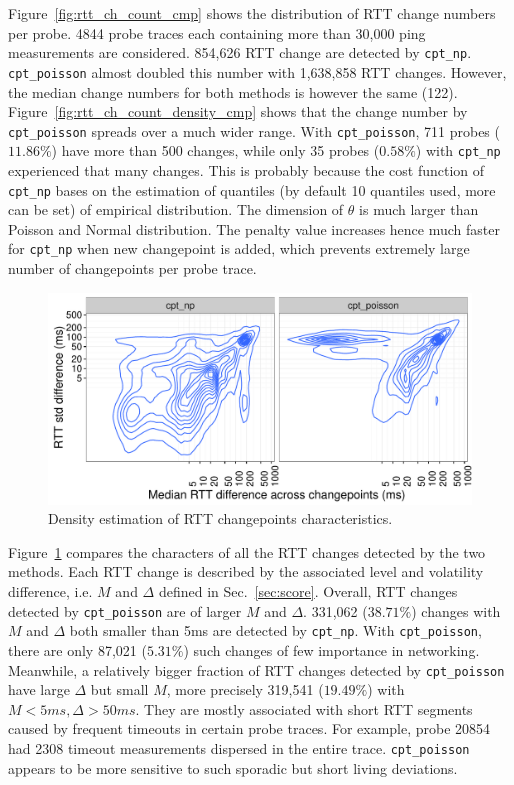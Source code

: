 Figure~\ref{fig:rtt_ch_count_cmp} shows the distribution of RTT change numbers per probe. 4844 probe traces each containing more than 30,000 ping measurements are considered. 
854,626 RTT change are detected by \texttt{cpt\_np}.
\texttt{cpt\_poisson} almost doubled this number with 1,638,858 RTT changes.
However, the median change numbers for both methods is however the same (122).
Figure~\ref{fig:rtt_ch_count_density_cmp} shows that the change number by \texttt{cpt\_poisson} spreads over a much wider range.
With \texttt{cpt\_poisson}, 711 probes ($11.86\%$) have more than 500 changes, while only 35 probes ($0.58\%$) with \texttt{cpt\_np} experienced that many changes.
This is probably because the cost function of \texttt{cpt\_np} bases on the estimation of quantiles (by default 10 quantiles used, more can be set) of empirical distribution. The dimension of $\theta$ is much larger than Poisson and Normal distribution. The penalty value increases hence much faster for \texttt{cpt\_np} when new changepoint is added, which prevents extremely large number of changepoints per probe trace.

\begin{figure}[!thb]
\centering
\includegraphics[width=.96\textwidth]{gfx/chap4/rtt_ch_chara_cmp.pdf}
\caption{Density estimation of RTT changepoints characteristics.}
\label{fig:rtt_chara_cmp}
\end{figure}
Figure~\ref{fig:rtt_chara_cmp} compares the characters of all the RTT changes detected by the two methods.
Each RTT change is described by the associated level and volatility difference, i.e. $M$ and $\Delta$ defined in Sec.~\ref{sec:score}. 
Overall, RTT changes detected by \texttt{cpt\_poisson} are of larger $M$ and $\Delta$.
331,062 ($38.71\%$) changes with $M$ and $\Delta$ both smaller than 5ms are detected by \texttt{cpt\_np}.
With \texttt{cpt\_poisson}, there are only 87,021 ($5.31\%$) such changes of few importance in networking.
Meanwhile, a relatively bigger fraction of RTT changes detected by \texttt{cpt\_poisson} have large $\Delta$ but small $M$, more precisely 319,541 ($19.49\%$) with $M<5ms, \Delta>50ms$.
They are mostly associated with short RTT segments caused by frequent timeouts in certain probe traces. For example, probe 20854 had 2308 timeout measurements dispersed in the entire trace.
\texttt{cpt\_poisson} appears to be more sensitive to such sporadic but short living deviations.

